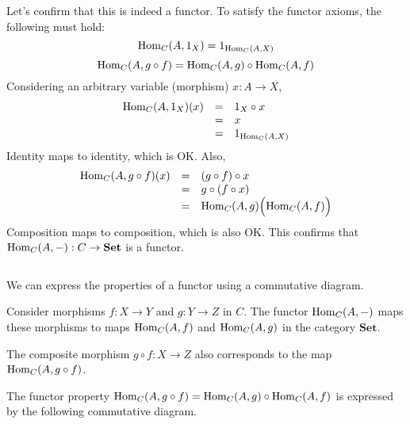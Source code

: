 \documentclass[uplatex,a4j,12pt,dvipdfmx]{jsarticle}
\begin{document}
Let's confirm that this is indeed a functor.
To satisfy the functor axioms, the following must hold:
\[
	{\rm Hom}_{C}(A,1_{X}) = 1_{{\rm Hom}_{C} (A,X)}
\]
\[
	{\rm Hom}_{C}(A,g \circ f) = {\rm Hom}_{C} (A,g) \circ {\rm Hom}_{C} (A,f)
\]
Considering an arbitrary variable (morphism)
$x: A \to X$,
\[
	\begin{array}{rcl}
		{\rm Hom}_{C}(A,1_{X})(x) & = & 1_{X} \circ x           \\
		                          & = & x                       \\
		                          & = & 1_{{\rm Hom}_{C} (A,X)}
	\end{array}
\]
Identity maps to identity, which is OK. Also,
\[
	\begin{array}{rcl}
		{\rm Hom}_{C}(A,g \circ f)(x) & = & (g \circ f) \circ x                               \\
		                              & = & g \circ (f \circ x)                               \\
		                              & = & {\rm Hom}_{C}(A,g) \Big( {\rm Hom}_{C}(A,f) \Big)
	\end{array}
\]
Composition maps to composition, which is also OK. This confirms that
${\rm Hom}_{C}(A,-) : C \to \mathbf{Set}$
is a functor.

${}$

We can express the properties of a functor using a commutative diagram.

Consider morphisms $f: X \to Y$ and $g: Y \to Z$ in $C$.
The functor ${\rm Hom}_{C}(A,-)$ maps these morphisms to maps ${\rm Hom}_{C}(A,f)$ and ${\rm Hom}_{C}(A,g)$ in the category $\mathbf{Set}$.

The composite morphism
$g \circ f: X \to Z$
also corresponds to the map ${\rm Hom}_{C}(A,g \circ f)$.

The functor property
${\rm Hom}_{C}(A,g \circ f) = {\rm Hom}_{C} (A,g) \circ {\rm Hom}_{C}(A,f)$
is expressed by the following commutative diagram.
\end{document}
